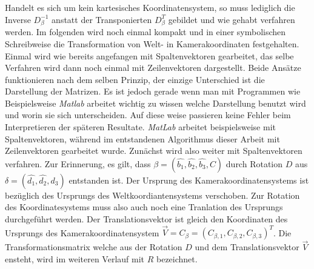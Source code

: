 Handelt es sich um kein kartesisches Koordinatensystem, so muss lediglich die Inverse \ensuremath{D_\beta^{-1}} anstatt der Transponierten \ensuremath{D_\beta^T} gebildet und wie gehabt verfahren werden. Im folgenden wird noch einmal kompakt und in einer symbolischen Schreibweise die Transformation von Welt- in Kamerakoordinaten  festgehalten. Einmal wird wie bereits angefangen mit Spaltenvektoren gearbeitet, das selbe Verfahren wird dann noch einmal mit Zeilenvektoren dargestellt.  Beide Ansätze funktionieren nach dem selben Prinzip, der einzige Unterschied ist die Darstellung der Matrizen. Es ist jedoch gerade wenn man mit Programmen wie Beispielsweise \textit{Matlab} arbeitet wichtig zu wissen welche Darstellung benutzt wird und worin sie sich unterscheiden. Auf diese weise passieren keine Fehler beim Interpretieren der späteren Resultate. \textit{MatLab} arbeitet beispielsweise mit Spaltenvektoren, während im entstandenen Algorithmus dieser Arbeit mit Zeilenvektoren gearbeitet wurde. Zunächst wird also weiter mit Spaltenvektoren verfahren. Zur Erinnerung, es gilt, dass $\beta = (\hat{b_1},\hat{b_2},\hat{b_3},C)$ durch Rotation $D$ aus $\delta = (\hat{d_1},\hat{d_2},\hat{d_3})$ entstanden ist. Der Ursprung des Kamerakoordinatensystems ist bezüglich des Ursprungs des Weltkoordiantensystems verschoben. Zur Rotation des Koordinatesystems muss also auch noch eine Tranlation des Ursprungs durchgeführt werden. Der Translationsvektor ist gleich den Koordinaten des Ursprungs des Kamerakoordinatensystem $\vec{V} = C_\beta = (C_{\beta,1}, C_{\beta,2}, C_{\beta,3})^T$. Die Transformationsmatrix welche aus der Rotation $D$ und dem Translationsvektor $\vec{V}$ ensteht, wird im weiteren Verlauf mit $R$ bezeichnet.

	
